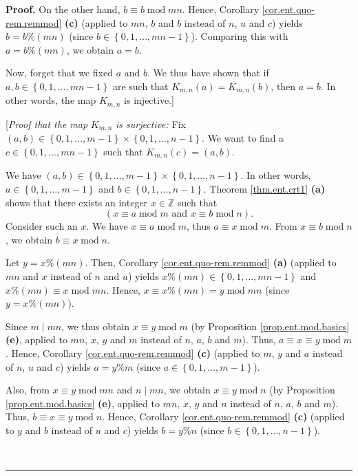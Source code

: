 \documentclass[numbers=enddot,12pt,final,onecolumn,notitlepage]{scrartcl}%
\numberwithin{exer}{subsection}
\theoremstyle{definition}
\newenvironment{proof}[1][Proof]{\noindent\textbf{#1.} }{\ \rule{0.5em}{0.5em}}
\begin{document}
\begin{proof}
On the other hand, $b\equiv b\operatorname{mod}mn$. Hence, Corollary
\ref{cor.ent.quo-rem.remmod} \textbf{(c)} (applied to $mn$, $b$ and $b$
instead of $n$, $u$ and $c$) yields $b=b\%\left(  mn\right)  $ (since
$b\in\left\{  0,1,\ldots,mn-1\right\}  $). Comparing this with $a=b\%\left(
mn\right)  $, we obtain $a=b$.

Now, forget that we fixed $a$ and $b$. We thus have shown that if
$a,b\in\left\{  0,1,\ldots,mn-1\right\}  $ are such that $K_{m,n}\left(
a\right)  =K_{m,n}\left(  b\right)  $, then $a=b$. In other words, the map
$K_{m,n}$ is injective.]

[\textit{Proof that the map }$K_{m,n}$ \textit{is surjective:} Fix $\left(
a,b\right)  \in\left\{  0,1,\ldots,m-1\right\}  \times\left\{  0,1,\ldots
,n-1\right\}  $. We want to find a $c\in\left\{  0,1,\ldots,mn-1\right\}  $
such that $K_{m,n}\left(  c\right)  =\left(  a,b\right)  $.

We have $\left(  a,b\right)  \in\left\{  0,1,\ldots,m-1\right\}
\times\left\{  0,1,\ldots,n-1\right\}  $. In other words, $a\in\left\{
0,1,\ldots,m-1\right\}  $ and $b\in\left\{  0,1,\ldots,n-1\right\}  $. Theorem
\ref{thm.ent.crt1} \textbf{(a)} shows that there exists an integer
$x\in\mathbb{Z}$ such that%
\[
\left(  x\equiv a\operatorname{mod}m\text{ and }x\equiv b\operatorname{mod}%
n\right)  .
\]
Consider such an $x$. We have $x\equiv a\operatorname{mod}m$, thus $a\equiv
x\operatorname{mod}m$. From $x\equiv b\operatorname{mod}n$, we obtain $b\equiv
x\operatorname{mod}n$.

Let $y=x\%\left(  mn\right)  $. Then, Corollary \ref{cor.ent.quo-rem.remmod}
\textbf{(a)} (applied to $mn$ and $x$ instead of $n$ and $u$) yields
$x\%\left(  mn\right)  \in\left\{  0,1,\ldots,mn-1\right\}  $ and $x\%\left(
mn\right)  \equiv x\operatorname{mod}mn$. Hence, $x\equiv x\%\left(
mn\right)  =y\operatorname{mod}mn$ (since $y=x\%\left(  mn\right)  $).

Since $m\mid mn$, we thus obtain $x\equiv y\operatorname{mod}m$ (by
Proposition \ref{prop.ent.mod.basics} \textbf{(e)}, applied to $mn$, $x$, $y$
and $m$ instead of $n$, $a$, $b$ and $m$). Thus, $a\equiv x\equiv
y\operatorname{mod}m$. Hence, Corollary \ref{cor.ent.quo-rem.remmod}
\textbf{(c)} (applied to $m$, $y$ and $a$ instead of $n$, $u$ and $c$) yields
$a=y\%m$ (since $a\in\left\{  0,1,\ldots,m-1\right\}  $).

Also, from $x\equiv y\operatorname{mod}mn$ and $n\mid mn$, we obtain $x\equiv
y\operatorname{mod}n$ (by Proposition \ref{prop.ent.mod.basics} \textbf{(e)},
applied to $mn$, $x$, $y$ and $n$ instead of $n$, $a$, $b$ and $m$). Thus,
$b\equiv x\equiv y\operatorname{mod}n$. Hence, Corollary
\ref{cor.ent.quo-rem.remmod} \textbf{(c)} (applied to $y$ and $b$ instead of
$u$ and $c$) yields $b=y\%n$ (since $b\in\left\{  0,1,\ldots,n-1\right\}  $).


\end{proof}
\end{document}

